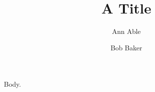 \documentclass[english]{lni}
\title{A Title}
\author[Ann Able \and Bob Baker]{Ann Able \and Bob Baker}
\begin{document}
\maketitle
Body.
\end{document}
